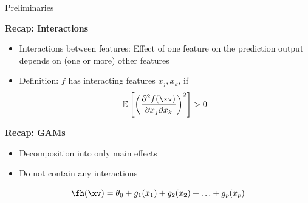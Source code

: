\documentclass[11pt,compress,t,notes=noshow, aspectratio=169, xcolor=table]{beamer}
\begin{document}
\begin{frame}{Preliminaries}

    \textbf{Recap: Interactions}
    \begin{itemize}
        \item Interactions between features: Effect of one feature on the prediction output depends on (one or more) other features
        \item Definition: $f$ has interacting features $x_j, x_k$, if
        $$
        \mathbb{E} \left[ \left( \frac{\partial^2 f(\xv)}{\partial x_j \partial x_k} \right)^2 \right] > 0
        $$
    \end{itemize}
    
    \pause
    \textbf{Recap: GAMs}
    \begin{itemize}
        \item Decomposition into only main effects
        \item Do not contain any interactions
    \end{itemize}
    $$
    \fh (\xv) = \theta_0 + g_1(x_1) + g_2(x_2) + \ldots + g_p(x_p)
    $$



\end{frame}
\end{document}
